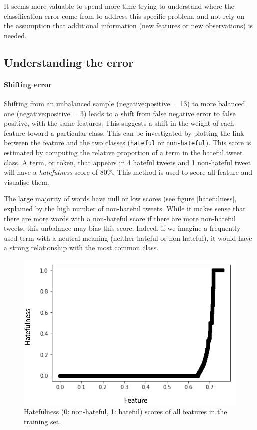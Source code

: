 \documentclass[a4paper]{tufte-handout}
\begin{document}
\begin{fullwidth}
It seems more valuable to spend more time trying to understand where the classification error come from to address this specific problem, and not rely on the assumption that additional information (new features or new observations) is needed.


\subsection{Understanding the error}

\paragraph{Shifting error}

Shifting from an unbalanced sample (negative:positive = 13) to more balanced one (negative:positive = 3) leads to a shift from false negative error to false positive, with the same features. This suggests a shift in the weight of each feature toward a particular class. This can be investigated by plotting the link between the feature and the two classes (\texttt{hateful} or \texttt{non-hateful}). This score is estimated by computing the relative proportion of a term in the hateful tweet class. A term, or token, that appears in 4 hateful tweets and 1 non-hateful tweet will have a \textit{hatefulness} score of 80\%. This method is used to score all feature and visualise them.


The large majority of words have null or low scores (see figure \ref{hatefulness}, explained by the high number of non-hateful tweets. While it makes sense that there are more words with a non-hateful score if there are more non-hateful tweets, this unbalance may bias this score. Indeed, if we imagine a frequently used term with a neutral meaning (neither hateful or non-hateful), it would have a strong relationship with the most common class. 

\begin{figure}\label{hatefulness}
  \includegraphics[]{images/hatefulness.pdf}
  \caption{Hatefulness (0: non-hateful, 1: hateful) scores of all features in the training set.}
  \label{fig:marginfig}
\end{figure}


\end{fullwidth}
\end{document}
